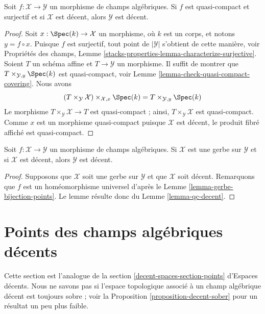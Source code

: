 \begin{lemma}
\label{lemma-qc-decent}
Soit $f : \mathcal{X} \to \mathcal{Y}$ un morphisme de champs algébriques.
Si $f$ est quasi-compact et surjectif et si $\mathcal{X}$ est décent,
alors $\mathcal{Y}$ est décent.
\end{lemma}

\begin{proof}
Soit $x : \Spec(k) \to \mathcal{X}$ un morphisme, où $k$ est un corps,
et notons $y = f \circ x$. Puisque $f$ est surjectif, tout point
de $|\mathcal{Y}|$ s'obtient de cette manière, voir Propriétés des champs,
Lemme \ref{stacks-properties-lemma-characterize-surjective}.
Soient $T$ un schéma affine et $T \to \mathcal{Y}$ un morphisme.
Il suffit de montrer que
$T \times_{\mathcal{Y}, y} \Spec(k)$ est quasi-compact, voir
Lemme \ref{lemma-check-quasi-compact-covering}.
Nous avons
$$
(T \times_{\mathcal{Y}} \mathcal{X}) \times_{\mathcal{X}, x} \Spec(k) =
T \times_{\mathcal{Y}, y} \Spec(k)
$$
Le morphisme $T \times_{\mathcal{Y}} \mathcal{X} \to T$ est quasi-compact ;
ainsi, $T \times_\mathcal{Y} \mathcal{X}$ est quasi-compact. Comme $x$ est
un morphisme quasi-compact puisque $\mathcal{X}$ est décent,
le produit fibré affiché est quasi-compact.
\end{proof}

\begin{lemma}
\label{lemma-gerbe-decent}
Soit $f : \mathcal{X} \to \mathcal{Y}$ un morphisme de champs algébriques.
Si $\mathcal{X}$ est une gerbe sur $\mathcal{Y}$ et si $\mathcal{X}$ est décent,
alors $\mathcal{Y}$ est décent.
\end{lemma}

\begin{proof}
Supposons que $\mathcal{X}$ soit une gerbe sur $\mathcal{Y}$ et que
$\mathcal{X}$ soit décent. Remarquons que $f$ est un homéomorphisme universel
d'après le Lemme \ref{lemma-gerbe-bijection-points}.
Le lemme résulte donc du Lemme \ref{lemma-qc-decent}.
\end{proof}


\section{Points des champs alg\'ebriques d\'ecents}
\label{section-points-decent}

\noindent
Cette section est l'analogue de la section
\ref{decent-spaces-section-points} d'Espaces d\'ecents.
Nous ne savons pas si l'espace topologique associ\'e
\`a un champ alg\'ebrique d\'ecent est toujours sobre ; voir
la Proposition \ref{proposition-decent-sober} pour un r\'esultat
un peu plus faible.

